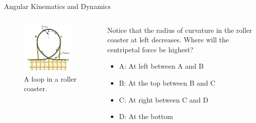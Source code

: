 \documentclass{beamer}
\begin{document}
\begin{frame}{Angular Kinematics and Dynamics}
\begin{columns}[T]
\begin{column}{0.5\textwidth}
\begin{figure}
\centering
\includegraphics[width=0.9\textwidth]{figures/loop.png}
\caption{\label{fig:loop1} A loop in a roller coaster.}
\end{figure}
\end{column}
\begin{column}{0.5\textwidth}
\small
Notice that the radius of curvature in the roller coaster at left decreases.  Where will the centripetal force be highest?
\begin{itemize}
\item A: At left between A and B
\item B: At the top between B and C
\item C: At right between C and D
\item D: At the bottom
\end{itemize}
\end{column}
\end{columns}
\end{frame}
\end{document}
